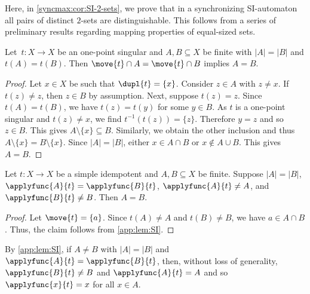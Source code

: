 
Here, in \cref{syncmax:cor:SI-2-sets}, we prove that in a synchronizing SI-automaton
all pairs of distinct $2$-sets are distinguishable.
This follows from a series of preliminary results 
regarding mapping properties of equal-sized sets.

\begin{lemma} \label{app:lem:SI}
	Let~$t \colon X \to X$ be an one-point singular
	and $A,B \subseteq X$ be finite
	with $|A| = |B|$ and $t(A) = t(B)$.
	Then $\move{t} \cap A = \move{t} \cap B$ implies $A = B$.
\end{lemma}
\begin{proof} 
	Let $x \in X$ be such that $\dupl{t} = \{x\}$.
	Consider $z \in A$ with $z \ne x$.
	If $t(z) \ne z$, then $z \in B$ by assumption.
	Next, suppose $t(z) = z$.
	Since $t(A) = t(B)$,
	we have $t(z) = t(y)$ for some $y \in B$.
	As $t$ is a one-point singular
	and $t(z) \ne x$,
	we find $t^{-1}(t(z)) = \{z\}$. Therefore $y = z$
	and so $z \in B$.
	This gives $A \setminus \{x\} \subseteq B$.
	Similarly, we obtain the other inclusion
	and thus $A \setminus \{x\} = B \setminus \{x\}$.
	Since $|A| = |B|$, 
	either $x \in A \cap B$ or $x \notin A \cup B$.
	This gives $A = B$.	
\end{proof}

\begin{corollary} \label{app:cor:SI}
		Let $t \colon X\to X$ be a simple idempotent
		and $A, B \subseteq X$ be finite.
		Suppose $|A| = |B|$, $\applyfunc{A}{t} = \applyfunc{B}{t}$, 
		$\applyfunc{A}{t} \ne A$, and $\applyfunc{B}{t} \ne B$.
		Then $A = B$.	
\end{corollary}
\begin{proof}
Let $\move{t} = \{a\}$.
Since $t(A) \ne A$ and $t(B) \ne B$, we have $a \in A \cap B$.	
Thus, the claim follows from \cref{app:lem:SI}.
\end{proof}

By \cref{app:lem:SI}, if $A \ne B$ with $|A| = |B|$ and $\applyfunc{A}{t} = \applyfunc{B}{t}$,
then, without loss of generality, $\applyfunc{B}{t} \ne B$
and $\applyfunc{A}{t} = A$ and so $\applyfunc{x}{t} = x$ for all $x \in A$. 

